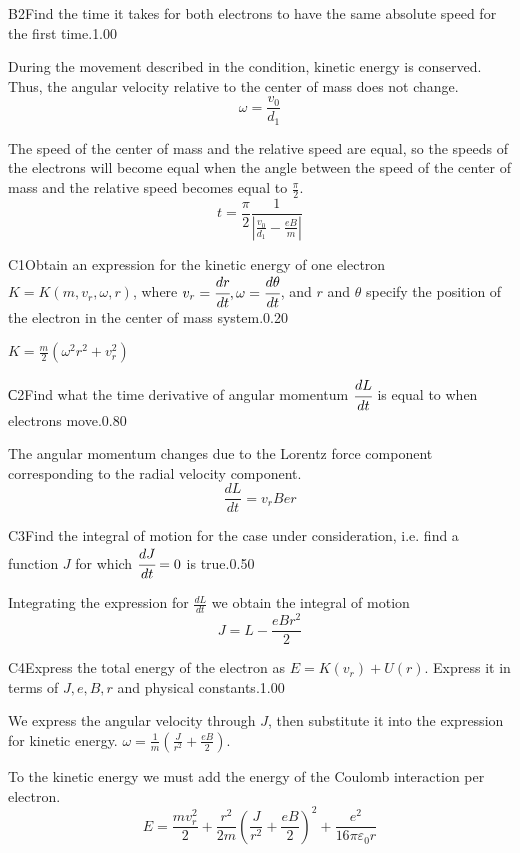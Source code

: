 \documentclass[11pt,a4paper]{article}
\begin{document}
\begin{solcard}{B2}{Find the time it takes for both electrons to have the same absolute speed for the first time.}{1.00}

During the movement described in the condition, kinetic energy is conserved. Thus, the angular velocity relative to the center of mass does not change. $$\omega = \frac{v_0}{d_1}$$


The speed of the center of mass and the relative speed are equal, so the speeds of the electrons will become equal when the angle between the speed of the center of mass and the relative speed becomes equal to $\frac{\pi}{2}$. $$t = \frac{\pi}{2}\frac{1}{\left|\frac{v_0}{d_1} - \frac{eB}{m}\right|}$$

\end{solcard}

\begin{solcard}{C1}{Obtain an expression for the kinetic energy of one electron $K=K(m, v_r, \omega, r)$, where $v_r=\cfrac{dr}{dt}, \omega=\cfrac{d\theta}{dt}$, and $r$ and $\theta$ specify the position of the electron in the center of mass system.}{0.20}

$K=\frac{m}{2}(\omega^2r^2+v_r^2)$

\end{solcard}

\begin{solcard}{С2}{Find what the time derivative of angular momentum $\cfrac{dL}{dt}$ is equal to when electrons move.}{0.80}

The angular momentum changes due to the Lorentz force component corresponding to the radial velocity component. $$\frac{dL}{dt} = v_rBer$$

\end{solcard}

\begin{solcard}{C3}{Find the integral of motion for the case under consideration, i.e. find a function $J$ for which $\cfrac{dJ}{dt}=0$ is true.}{0.50}

Integrating the expression for $\frac{dL}{dt}$ we obtain the integral of motion $$J = L-\frac{eBr^2}{2}$$

\end{solcard}

\begin{solcard}{C4}{Express the total energy of the electron as $E=K(v_r)+U(r)$. Express it in terms of $J, e, B, r$ and physical constants.}{1.00}

We express the angular velocity through $J$, then substitute it into the expression for kinetic energy. $\omega  = \frac{1}{m}\left(\frac{J}{r^2}+\frac{eB}{2}\right)$.


To the kinetic energy we must add the energy of the Coulomb interaction per electron. $$E = \frac{mv_r^2}{2}+\frac{r^2}{2m}\left(\frac{J}{r^2}+\frac{eB}{2}\right)^2+\frac{e^2}{16\pi\varepsilon_0r}$$

\end{solcard}
\end{document}
